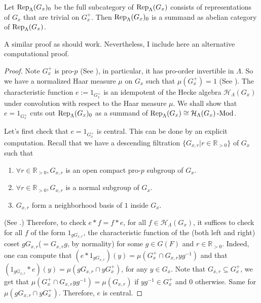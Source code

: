 		
		\begin{lemma}\label{Lem Summand}
			Let $\operatorname{\operatorname{Rep}}_{\Lambda}(G_x)_0$ be the full subcategory of $\operatorname{\operatorname{Rep}}_{\Lambda}(G_x)$ consists of representations of $G_x$ that are trivial on $G_x^+$. Then $\operatorname{\operatorname{Rep}}_{\Lambda}(G_x)_0$ is a summand as abelian category of $\operatorname{\operatorname{Rep}}_{\Lambda}(G_x)$.
		\end{lemma}
		
		\begin{remark}
			A similar proof as \cite[Appendix]{dat2009finitude} should work. Nevertheless, I include here an alternative computational proof. 
		\end{remark}
		
		\begin{proof}
			Note $G_x^+$ is pro-$p$ (See \cite[II.5.2.(b)]{vigneras1996representations}), in particular, it has pro-order invertible in $\Lambda$. So we have a normalized Haar measure $\mu$ on $G_x$ such that $\mu(G_x^+)=1$ (See \cite[I.2.4]{vigneras1996representations}). The characteristic function $e:=1_{G_x^+}$ is an idempotent of the Hecke algebra $\mathcal{H}_{\Lambda}(G_x)$ under convolution with respect to the Haar measure $\mu$. We shall show that $e=1_{G_x^+}$ cuts out $\operatorname{\operatorname{Rep}}_{\Lambda}(G_x)_0$ as a summand of $\operatorname{\operatorname{Rep}}_{\Lambda}(G_x) \cong \mathcal{H}_{\Lambda}(G_x)\operatorname{-Mod}$.
			
			Let's first check that $e=1_{G_x^+}$ is central. This can be done by an explicit computation. Recall that we have a descending filtration $\{G_{x,r} | r\in \mathbb{R}_{>0}\}$ of $G_x$ such that 
			\begin{enumerate}
				\item $\forall r \in \mathbb{R}_{>0}, G_{x,r}$ is an open compact pro-$p$ subgroup of $G_x$.
				\item $\forall r \in \mathbb{R}_{>0}, G_{x,r}$ is a normal subgroup of $G_x$.
				\item $G_{x,r}$ form a neighborhood basis of $1$ inside $G_x$. 
			\end{enumerate}
			(See \cite[II.5.1]{vigneras1996representations}.) Therefore, to check $e \ast f=f \ast e$, for all $f \in \mathcal{H}_{\Lambda}(G_x)$, it suffices to check for all $f$ of the form $1_{gG_{x,r}}$, the characteristic function of the (both left and right) coset $gG_{x,r}$($=G_{x,r}g$, by normality) for some $g \in G(F)$ and $r \in \mathbb{R}_{>0}$. Indeed, one can compute that $(e \ast 1_{gG_{x,r}})(y)=\mu(G_x^+\cap G_{x,r}yg^{-1})$ and that $(1_{gG_{x,r}} \ast e)(y)=\mu(gG_{x,r}\cap yG_x^+)$, for any $y \in G_x$. Note that $G_{x,r} \subseteq G_x^+$, we get that $\mu(G_x^+\cap G_{x,r}yg^{-1})=\mu(G_{x,r})$ if $yg^{-1} \in G_x^+$ and $0$ otherwise. Same for $\mu(gG_{x,r}\cap yG_x^+)$. Therefore, $e$ is central.
			

\end{proof}
